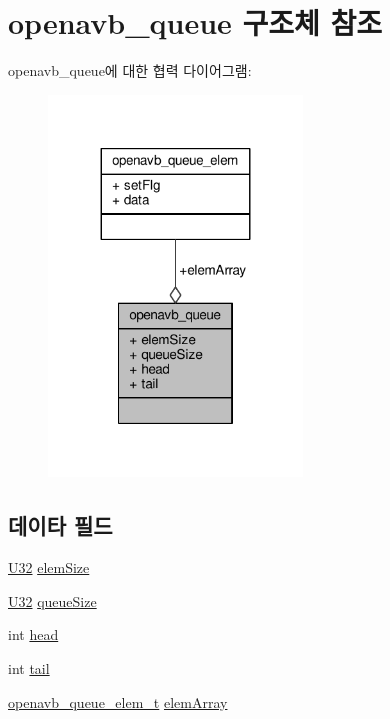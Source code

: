 \hypertarget{structopenavb__queue}{}\section{openavb\+\_\+queue 구조체 참조}
\label{structopenavb__queue}


openavb\+\_\+queue에 대한 협력 다이어그램\+:
\nopagebreak
\begin{figure}[H]
\begin{center}
\leavevmode
\includegraphics[width=191pt]{structopenavb__queue__coll__graph}
\end{center}
\end{figure}
\subsection*{데이타 필드}
\begin{DoxyCompactItemize}
\item 
\hyperlink{openavb__types__base__pub_8h_a696390429f2f3b644bde8d0322a24124}{U32} \hyperlink{structopenavb__queue_a838e119281056414fd5e0641cf388263}{elem\+Size}
\item 
\hyperlink{openavb__types__base__pub_8h_a696390429f2f3b644bde8d0322a24124}{U32} \hyperlink{structopenavb__queue_ae76ce4b41a375022c23a3860f8993fe3}{queue\+Size}
\item 
int \hyperlink{structopenavb__queue_a20358970b1abaf992eb85e071e454653}{head}
\item 
int \hyperlink{structopenavb__queue_aff39d864a6594bc5f4a5e365282e00fe}{tail}
\item 
\hyperlink{openavb__queue_8h_a881f882c33bbe541e91b6efb9b6f9752}{openavb\+\_\+queue\+\_\+elem\+\_\+t} \hyperlink{structopenavb__queue_aa873c90780da304face067f158fb98b6}{elem\+Array}
\end{DoxyCompactItemize}


